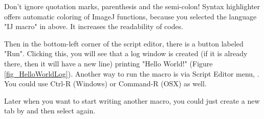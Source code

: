 Don't ignore quotation marks, parenthesis and the semi-colon! 
Syntax highlighter offers automatic coloring of ImageJ functions, because you selected the language "IJ macro" in above. It increases the readability of codes.

Then in the bottom-left corner of the script editor, there is a button labeled "Run". Clicking this, you will see that a log window is created (if it is already there, then it will have a new line) printing "Hello World!" (Figure \ref{fig_HelloWorldLog}). Another way to run the macro is via Script Editor menu,   . You could use Ctrl-R (Windows) or Command-R (OSX) as well.

Later when you want to start writing another macro, you could just create a new tab by  and then select  again.